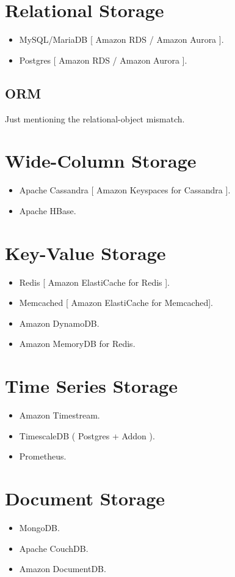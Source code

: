 \documentclass{csse4400}
\begin{document}
\section{Relational Storage}
\begin{itemize}
  \item MySQL/MariaDB [ Amazon RDS / Amazon Aurora ].
  \item Postgres [ Amazon RDS / Amazon Aurora ].
\end{itemize}

  \subsection{ORM}
  Just mentioning the relational-object mismatch.

\section{Wide-Column Storage}
  \begin{itemize}
    \item Apache Cassandra [ Amazon Keyspaces for Cassandra ].
    \item Apache HBase.
  \end{itemize}

\section{Key-Value Storage}
\begin{itemize}
  \item Redis [ Amazon ElastiCache for Redis ].
  \item Memcached [ Amazon ElastiCache for Memcached].
  \item Amazon DynamoDB.
  \item Amazon MemoryDB for Redis.
\end{itemize}

\section{Time Series Storage}
\begin{itemize}
  \item Amazon Timestream.
  \item TimescaleDB ( Postgres + Addon ).
  \item Prometheus.
\end{itemize}

\section{Document Storage}
\begin{itemize}
  \item MongoDB.
  \item Apache CouchDB.
  \item Amazon DocumentDB.
\end{itemize}
\end{document}
